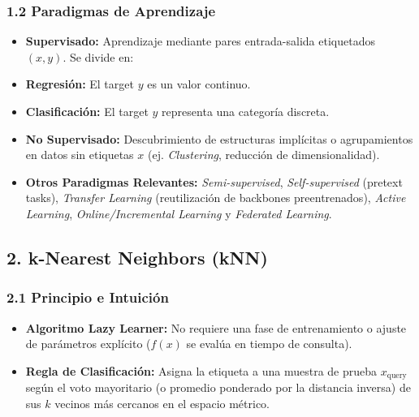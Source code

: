 \documentclass[11pt,oneside]{article}
\begin{document}
\subsubsection{1.2 Paradigmas de Aprendizaje}

\begin{itemize}

\item \textbf{Supervisado:} Aprendizaje mediante pares entrada-salida etiquetados \((x, y)\). Se divide en:

\item \textbf{Regresión:} El target \(y\) es un valor continuo.

\item \textbf{Clasificación:} El target \(y\) representa una categoría discreta.

\item \textbf{No Supervisado:} Descubrimiento de estructuras implícitas o agrupamientos en datos sin etiquetas \(x\) (ej. \emph{Clustering}, reducción de dimensionalidad).

\item \textbf{Otros Paradigmas Relevantes:} \emph{Semi-supervised}, \emph{Self-supervised} (pretext tasks), \emph{Transfer Learning} (reutilización de backbones preentrenados), \emph{Active Learning}, \emph{Online/Incremental Learning} y \emph{Federated Learning}.

\end{itemize}

\subsection{2. k-Nearest Neighbors (kNN)}

\subsubsection{2.1 Principio e Intuición}

\begin{itemize}

\item \textbf{Algoritmo Lazy Learner:} No requiere una fase de entrenamiento o ajuste de parámetros explícito (\(f(x)\) se evalúa en tiempo de consulta).

\item \textbf{Regla de Clasificación:} Asigna la etiqueta a una muestra de prueba \(x_{\text{query}}\) según el voto mayoritario (o promedio ponderado por la distancia inversa) de sus \(k\) vecinos más cercanos en el espacio métrico.

\end{itemize}
\end{document}
